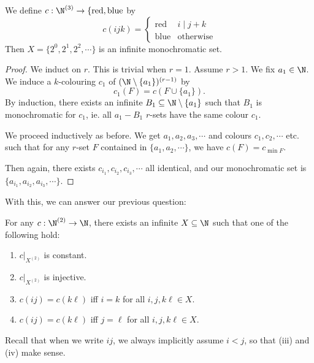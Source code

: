 \documentclass[a4paper]{article}
\begin{document}
\begin{eg}
  We define $c: \N^{(3)} \to \{\mathrm{red}, \mathrm{blue}$ by
  \[
    c(ijk) =
    \begin{cases}
      \mathrm{red} & i \mid j + k\\
      \mathrm{blue} & \mathrm{otherwise}
    \end{cases}
  \]
  Then $X = \{2^0, 2^1, 2^2, \cdots\}$ is an infinite monochromatic set.
\end{eg}


\begin{proof}
  We induct on $r$. This is trivial when $r = 1$. Assume $r > 1$. We fix $a_1 \in \N$. We induce a $k$-colouring $c_1$ of $(\N \setminus \{a_1\})^{(r - 1)}$ by
  \[
    c_1(F) = c(F \cup \{a_1\}).
  \]
  By induction, there exists an infinite $B_1 \subseteq \N \setminus \{a_1\}$ such that $B_1$ is monochromatic for $c_1$, ie. all $a_1-B_1$ $r$-sets have the same colour $c_1$.

  We proceed inductively as before. We get $a_1, a_2, a_3, \cdots$ and colours $c_1, c_2, \cdots$ etc. such that for any $r$-set $F$ contained in $\{a_1, a_2, \cdots\}$, we have $c(F) = c_{\min F}$.

  Then again, there exists $c_{i_1}, c_{i_2}, c_{i_3}, \cdots$ all identical, and our monochromatic set is $\{a_{i_1}, a_{i_2}, a_{i_3}, \cdots\}$.
\end{proof}

With this, we can answer our previous question:
\begin{thm}
  For any $c: \N^{(2)} \to \N$, there exists an infinite $X \subseteq \N$ such that one of the following hold:
  \begin{enumerate}
    \item $c|_{X^{(2)}}$ is constant.
    \item $c|_{X^{(2)}}$ is injective.
    \item $c(ij) = c(k\ell)$ iff $i = k$ for all $i, j, k \ell \in X$.
    \item $c(ij) = c(k\ell)$ iff $j = \ell$ for all $i, j, k \ell \in X$.
  \end{enumerate}
\end{thm}
Recall that when we write $ij$, we always implicitly assume $i < j$, so that (iii) and (iv) make sense.
\end{document}
